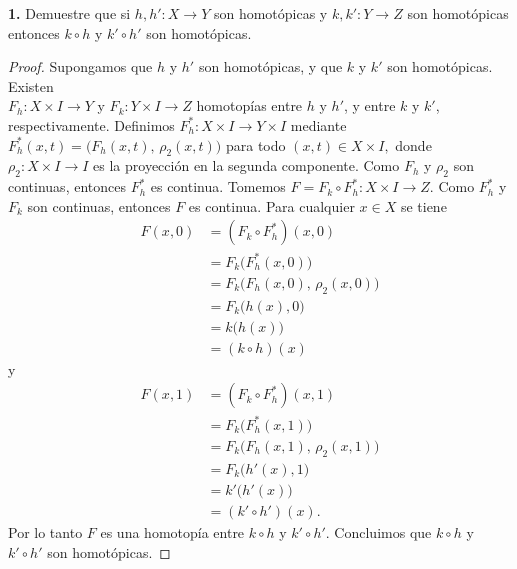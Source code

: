 \textbf{1.} Demuestre que si $h,h':X\to Y$ son homotópicas y $k,k':Y\to Z$ son homotópicas entonces $k\circ h$ y $k'\circ h'$ son homotópicas.
\begin{proof}
Supongamos que $h$ y $h'$ son homotópicas, y que $k$ y $k'$ son homotópicas. Existen\\$F_h:X\times I\to Y$ y $F_k:Y\times I\to Z$ homotopías entre $h$ y $h'$, y entre $k$ y $k'$, respectivamente. Definimos $F_h^*:X\times I\to Y\times I$ mediante $F_h^*(x,t)=\bigl(F_h(x,t),\, \rho_2(x,t)\bigr)$ para todo $(x,t)\in X\times I,$ donde $\rho_2:X\times I\to I$ es la proyección en la segunda componente. Como $F_h$ y $\rho_2$ son continuas, entonces $F_h^*$ es continua. Tomemos $F=F_k\circ F_h^*:X\times I\to Z$. Como $F_h^*$ y $F_k$ son continuas, entonces $F$ es continua. Para cualquier $x\in X$ se tiene
   \begin{align*}
      F(x,0)&=(F_k\circ F_h^*)(x,0)\\
      &=F_k\bigl(F_h^*(x,0)\bigr)\\
      &=F_k\bigl(F_h(x,0),\,\rho_2(x,0)\bigr)\\
      &=F_k\bigl(h(x),0\bigr)\\
      &=k\bigl(h(x)\bigr)\\
      &=(k\circ h)(x)
   \end{align*}
y
   \begin{align*}
      F(x,1)&=(F_k\circ F_h^*)(x,1)\\
      &=F_k\bigl(F_h^*(x,1)\bigr)\\
      &=F_k\bigl(F_h(x,1),\,\rho_2(x,1)\bigr)\\
      &=F_k\bigl(h'(x),1\bigr)\\
      &=k'\bigl(h'(x)\bigr)\\
      &=(k'\circ h')(x).
   \end{align*}
Por lo tanto $F$ es una homotopía entre $k\circ h$ y $k'\circ h'$. Concluimos que $k\circ h$ y $k'\circ h'$ son homotópicas.
\end{proof}\clearpage
